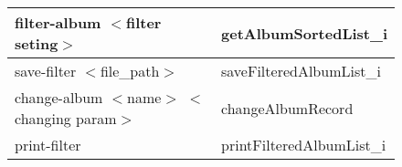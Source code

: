 \documentclass{article}
\begin{document}
\begin{figure}[H]
\begin{minipage}[t]{0.65\textwidth}
\begin{tabular}{|l|l|}
            filter-album $<$filter seting$>$                    & getAlbumSortedList\_i          \\ \hline    \rowcolor{tabYellow}
            save-filter $<$file\_path$>$                        & saveFilteredAlbumList\_i       \\ \hline    
            change-album $<$name$>$ $<$changing param$>$        & changeAlbumRecord              \\ \hline    \rowcolor{tabYellow}
            print-filter                                        & printFilteredAlbumList\_i      \\ \hline    
        \end{tabular}
    \end{minipage}
\end{figure}

\newpage









\end{document}
